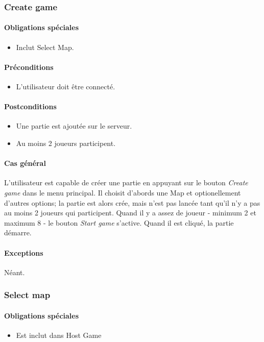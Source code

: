 \documentclass[a4paper,11pt]{report}
\begin{document}
\subsubsection{Create game}
\paragraph{Obligations spéciales}
\begin{itemize}
 \item Inclut Select Map.
\end{itemize}
\paragraph{Préconditions}
\begin{itemize}
 \item L'utilisateur doit être connecté.
\end{itemize}
\paragraph{Postconditions}
\begin{itemize}
 \item Une partie est ajoutée sur le serveur.
 \item Au moins 2 joueurs participent.
\end{itemize}
\paragraph{Cas général}
L'utilisateur est capable de créer une partie en appuyant sur le bouton \og \textit{Create game} \fg dans le menu principal.
Il choisit d'abords une Map et optionellement d'autres options; la partie est alors crée, mais n'est pas lancée tant qu'il n'y a pas au moins 2 joueurs qui participent.
Quand il y a assez de joueur - minimum 2 et maximum 8 - le bouton \og \textit{Start game} \fg s'active. Quand il est cliqué, la partie démarre.
\paragraph{Exceptions} Néant.

\newpage
\subsubsection{Select map}
\paragraph{Obligations spéciales}
\begin{itemize}
 \item Est inclut dans Host Game
\end{itemize}
\end{document}
